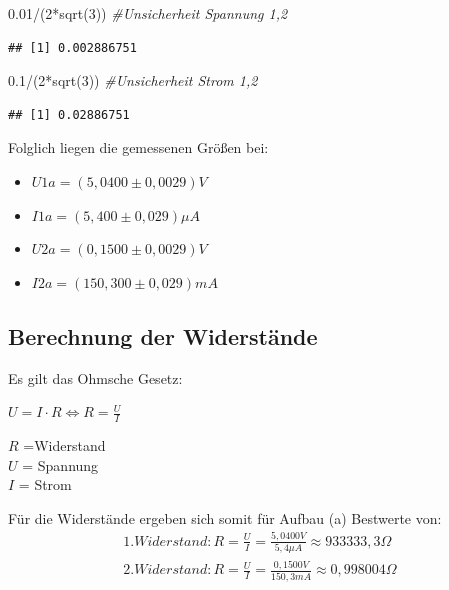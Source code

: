 \documentclass[
  9pt,
]{article}
\newenvironment{Shaded}{\begin{snugshade}}{\end{snugshade}}
\newcommand{\CommentTok}[1]{\textcolor[rgb]{0.56,0.35,0.01}{\textit{#1}}}
\newcommand{\DecValTok}[1]{\textcolor[rgb]{0.00,0.00,0.81}{#1}}
\newcommand{\FloatTok}[1]{\textcolor[rgb]{0.00,0.00,0.81}{#1}}
\newcommand{\FunctionTok}[1]{\textcolor[rgb]{0.00,0.00,0.00}{#1}}
\newcommand{\NormalTok}[1]{#1}
\newcommand{\SpecialCharTok}[1]{\textcolor[rgb]{0.00,0.00,0.00}{#1}}
\begin{document}
\begin{Shaded}
\begin{Highlighting}[]
\FloatTok{0.01}\SpecialCharTok{/}\NormalTok{(}\DecValTok{2}\SpecialCharTok{*}\FunctionTok{sqrt}\NormalTok{(}\DecValTok{3}\NormalTok{)) }\CommentTok{\#Unsicherheit Spannung 1,2}
\end{Highlighting}
\end{Shaded}

\begin{verbatim}
## [1] 0.002886751
\end{verbatim}

\begin{Shaded}
\begin{Highlighting}[]
\FloatTok{0.1}\SpecialCharTok{/}\NormalTok{(}\DecValTok{2}\SpecialCharTok{*}\FunctionTok{sqrt}\NormalTok{(}\DecValTok{3}\NormalTok{)) }\CommentTok{\#Unsicherheit Strom 1,2}
\end{Highlighting}
\end{Shaded}

\begin{verbatim}
## [1] 0.02886751
\end{verbatim}

Folglich liegen die gemessenen Größen bei:

\begin{itemize}
\item $U1a = (5,0400 \pm 0,0029)V$
\item $I1a = (5,400 \pm 0,029) \mu A$
\item $U2a = (0,1500 \pm 0,0029)V$
\item $I2a = (150,300 \pm 0,029) mA$
\end{itemize}

\hypertarget{berechnung-der-widerstuxe4nde}{%
\subsection{Berechnung der
Widerstände}\label{berechnung-der-widerstuxe4nde}}

Es gilt das Ohmsche Gesetz:

\(U=I\cdot R \Leftrightarrow R = \frac{U}{I}\)

\noindent \(R\) =Widerstand\\
\noindent \(U\) = Spannung\\
\noindent \(I\) = Strom

Für die Widerstände ergeben sich somit für Aufbau (a) Bestwerte von:
\begin{equation*}
\begin{split}
1. Widerstand: R=\frac{U}{I} = \frac {5,0400V}{5,4 \mu A} \approx 933333,3 \Omega \\
2.Widerstand: R=\frac{U}{I} = \frac {0,1500V}{150,3 mA} \approx 0,998004 \Omega \\
\end{split}
\end{equation*}
\end{document}
